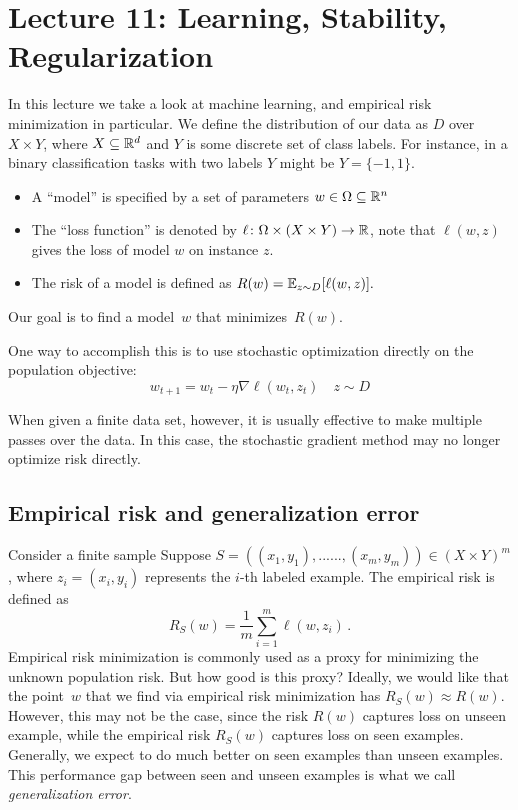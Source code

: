 \section{Lecture 11: Learning, Stability, Regularization}

In this lecture we take a look at machine learning, and empirical risk
minimization in particular. We define the distribution of our data as $D$ over
$X\times Y$, where $X\subseteq \mathbb{R}^{d}$ and $Y$ is some discrete set of class
labels. For instance, in a binary classification tasks with two labels $Y$ 
might be $ Y = \{ -1,1 \}$.
\begin{itemize}
\item A ``model'' is specified by a set of parameters $w \in
\Omega\subseteq\mathbb{R}^n$
\item The ``loss function'' is denoted by $\ell\colon \Omega \times (X\times Y)
\rightarrow \mathbb{R}$, note that $\ell(w,z)$ gives the loss of model $w$ on instance
$z.$
\item The risk of a model is defined as $R(w)=\operatorname*{\mathbb{E}}_{z\sim D}[\ell(w,z)].$
\end{itemize}
Our goal is to find a model~$w$ that minimizes~$R(w).$

One way to accomplish this is to use stochastic optimization directly on the
population objective:
$$w_{t+1} = w_{t} - \eta \nabla \ell(w_t,z_t) \quad z\sim D$$

When given a finite data set, however, it is usually effective to make multiple
passes over the data. In this case, the stochastic gradient method may no longer
optimize risk directly.
%
\subsection{Empirical risk and generalization error}

Consider a finite sample Suppose $S=((x_1,y_1),......,(x_m,y_m))\in(X\times
Y)^m$, where $z_i=(x_i,y_i)$ represents the $i$-th labeled example.
The empirical risk is defined as
\[
R_{S}(w) = \frac{1}{m}\sum_{i=1}^{m}\ell(w,z_i)\,.
\]
Empirical risk minimization is commonly used as a proxy for minimizing the
unknown population risk. But how good is this proxy? Ideally, we would like that
the point~$w$ that we find via empirical risk minimization has $R_S(w)\approx
R(w).$ However, this may not be the case, since the risk $R(w)$ captures loss on
unseen example, while the empirical risk $R_S(w)$ captures loss on seen
examples. Generally, we expect to do much better on seen examples than unseen
examples. This performance gap between seen and unseen examples is what we call
\emph{generalization error}.

